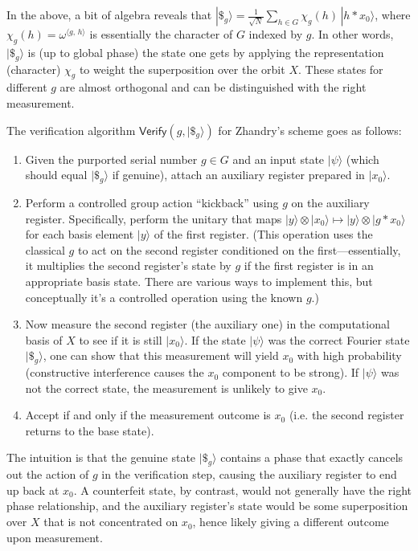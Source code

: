 \documentclass[12pt]{report}
\begin{document}
In the above, a bit of algebra reveals that $|\$_g\rangle = \frac{1}{\sqrt{N}} \sum_{h \in G} \chi_g(h)\, |h * x_0\rangle$, where $\chi_g(h) = \omega^{\langle g,\,h \rangle}$ is essentially the character of $G$ indexed by $g$. In other words, $|\$_g\rangle$ is (up to global phase) the state one gets by applying the representation (character) $\chi_g$ to weight the superposition over the orbit $X$. These states for different $g$ are almost orthogonal and can be distinguished with the right measurement.

The verification algorithm $\mathsf{Verify}(g, |\$_g\rangle)$ for Zhandry’s scheme goes as follows:
\begin{enumerate}
    \item Given the purported serial number $g \in G$ and an input state $|\psi\rangle$ (which should equal $|\$_g\rangle$ if genuine), attach an auxiliary register prepared in $|x_0\rangle$.
    \item Perform a controlled group action “kickback” using $g$ on the auxiliary register. Specifically, perform the unitary that maps $|y\rangle \otimes |x_0\rangle \mapsto |y\rangle \otimes |g * x_0 \rangle$ for each basis element $|y\rangle$ of the first register. (This operation uses the classical $g$ to act on the second register conditioned on the first—essentially, it multiplies the second register’s state by $g$ if the first register is in an appropriate basis state. There are various ways to implement this, but conceptually it’s a controlled operation using the known $g$.)
    \item Now measure the second register (the auxiliary one) in the computational basis of $X$ to see if it is still $|x_0\rangle$. If the state $|\psi\rangle$ was the correct Fourier state $|\$_g\rangle$, one can show that this measurement will yield $x_0$ with high probability (constructive interference causes the $x_0$ component to be strong). If $|\psi\rangle$ was not the correct state, the measurement is unlikely to give $x_0$.
    \item Accept if and only if the measurement outcome is $x_0$ (i.e. the second register returns to the base state).
\end{enumerate}

The intuition is that the genuine state $|\$_g\rangle$ contains a phase that exactly cancels out the action of $g$ in the verification step, causing the auxiliary register to end up back at $x_0$. A counterfeit state, by contrast, would not generally have the right phase relationship, and the auxiliary register’s state would be some superposition over $X$ that is not concentrated on $x_0$, hence likely giving a different outcome upon measurement.
\end{document}

